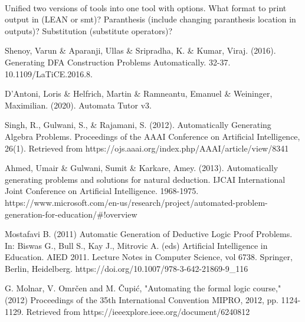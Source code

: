 \documentclass{report}
\begin{document}
\paragraph{}
Unified two versions of tools into one tool with options. What format to print output in (LEAN or smt)? Paranthesis (include changing paranthesis location in outputs)? Substitution (substitute operators)?



\begin{thebibliography}{20}
 Shenoy, Varun \& Aparanji, Ullas \& Sripradha, K. \& Kumar, Viraj. (2016). Generating DFA Construction Problems Automatically. 32-37. 10.1109/LaTiCE.2016.8. 


 D'Antoni, Loris \& Helfrich, Martin \& Ramneantu, Emanuel \& Weininger, Maximilian. (2020). Automata Tutor v3. 


 Singh, R., Gulwani, S., \& Rajamani, S. (2012). Automatically Generating Algebra Problems. Proceedings of the AAAI Conference on Artificial Intelligence, 26(1). Retrieved from https://ojs.aaai.org/index.php/AAAI/article/view/8341 


 Ahmed, Umair \& Gulwani, Sumit \& Karkare, Amey. (2013). Automatically generating problems and solutions for natural deduction. IJCAI International Joint Conference on Artificial Intelligence. 1968-1975. https://www.microsoft.com/en-us/research/project/automated-problem-generation-for-education/\#!overview


 Mostafavi B. (2011) Automatic Generation of Deductive Logic Proof Problems. In: Biswas G., Bull S., Kay J., Mitrovic A. (eds) Artificial Intelligence in Education. AIED 2011. Lecture Notes in Computer Science, vol 6738. Springer, Berlin, Heidelberg. https://doi.org/10.1007/978-3-642-21869-9\_116

 G. Molnar, V. Omrčen and M. Čupić, "Automating the formal logic course," (2012) Proceedings of the 35th International Convention MIPRO, 2012, pp. 1124-1129. Retrieved from https://ieeexplore.ieee.org/document/6240812

\end{thebibliography}
\end{document}
